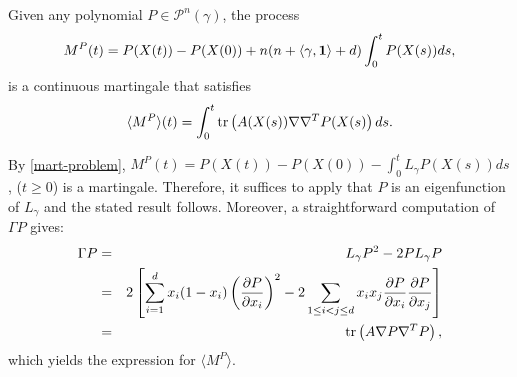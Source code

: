 \documentclass[12pt]{article}
\newcommand{\pol}[2]{\mathcal{P}^{#1}(#2)}
\begin{document}
\begin{cor}
    Given any polynomial $P\in\pol{n}{\gamma}$, the process \begin{equation}
     M^{P}(t)=P(X(t))-P(X(0))+n(n+\langle\gamma,\mathbf{1}\rangle+d)\int_0^t  P(X(s))ds,
    \end{equation}
    is a continuous martingale that satisfies
    \begin{equation}
        \langle M^P\rangle (t)=\int_0^t{\rm tr }\left(A(X(s))\nabla\nabla^TP(X(s)\right)ds.    \end{equation}
\end{cor}
\begin{pf}
    By \eqref{mart-problem}, $M^P(t)=P(X(t))-P(X(0))-\int_0^tL_\gamma P(X(s))ds$, ($t\geq 0$) is a martingale. Therefore, it suffices to apply that $P$ is an eigenfunction of $L_\gamma$ and the stated result follows. Moreover, a straightforward computation of $\Gamma P$ gives:
    \begin{eqnarray}
        \Gamma P&=&L_\gamma P^2-2P L_\gamma P\nonumber\\
        &=&2\left[\sum_{i=1}^dx_i(1-x_i)\left(\frac{\partial P}{\partial x_i}\right)^2-2\sum_{1\leq i<j\leq d}x_ix_j\frac{\partial P}{\partial x_i}\frac{\partial P}{\partial x_j}\right]\nonumber\\
        &=&{\rm tr }\left(A\nabla P\nabla^TP\right),
    \end{eqnarray}
    which yields the expression for $\langle M^P\rangle$.
\end{pf}
\end{document}
